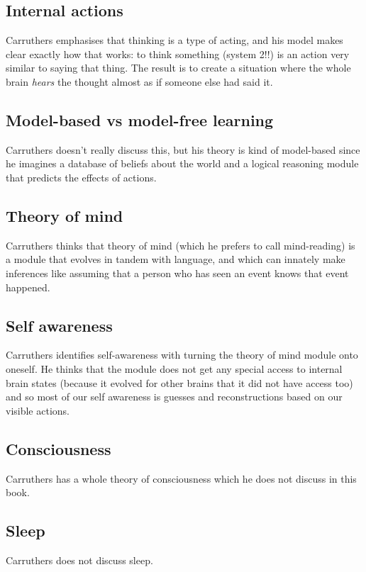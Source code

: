 \documentclass[10pt,a4paper]{article}
\begin{document}
\subsection{Internal actions}
Carruthers emphasises that thinking is a type of acting, and his model makes clear exactly how that works: to think something (system 2!!) is an action very similar to saying that thing. The result is to create a situation where the whole brain \emph{hears} the thought almost as if someone else had said it.

\subsection{Model-based vs model-free learning}
Carruthers doesn't really discuss this, but his theory is kind of model-based since he imagines a database of beliefs about the world and a logical reasoning module that predicts the effects of actions.

\subsection{Theory of mind}
Carruthers thinks that theory of mind (which he prefers to call mind-reading) is a module that evolves in tandem with language, and which can innately make inferences like assuming that a person who has seen an event knows that event happened.

\subsection{Self awareness}
Carruthers identifies self-awareness with turning the theory of mind module onto oneself. He thinks that the module does not get any special access to internal brain states (because it evolved for other brains that it did not have access too) and so most of our self awareness is guesses and reconstructions based on our visible actions.

\subsection{Consciousness}
Carruthers has a whole theory of consciousness which he does not discuss in this book.

\subsection{Sleep}
Carruthers does not discuss sleep.
\end{document}
